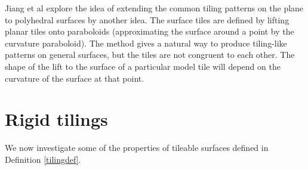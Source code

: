 \documentclass[11pt]{amsart}
\theoremstyle{remark}
\begin{document}
Jiang et al \cite{jiang2015polyhedral} explore the idea of extending the common tiling patterns on the plane to polyhedral surfaces by another idea.  The surface 
tiles are defined by lifting planar tiles onto paraboloids (approximating the surface around a point by the curvature paraboloid). The method gives a natural way to produce tiling-like patterns on general surfaces, but the tiles are not congruent to each other. The shape of the lift to the surface of a particular model tile will depend on the curvature of the surface at that point.







\pagebreak
 
\section{Rigid tilings} \label{rigidity}
We now investigate some of the properties of tileable surfaces defined in Definition \ref{tilingdef}.
\end{document}
